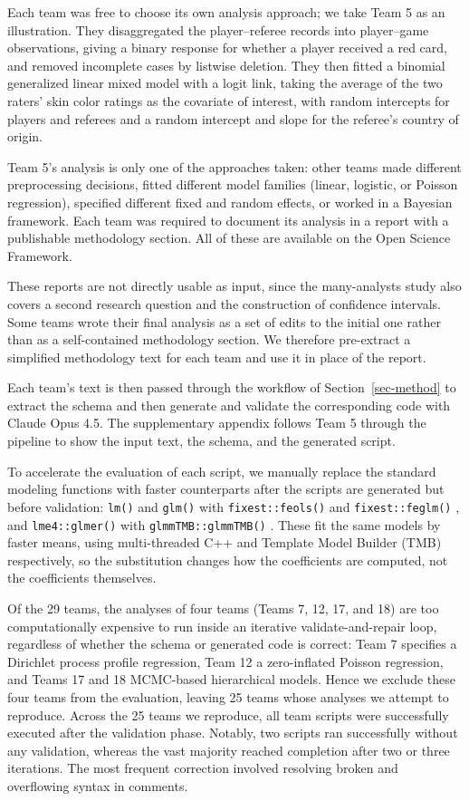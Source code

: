 \documentclass[aoas]{imsart}
\begin{document}
Each team was free to choose its own analysis approach; we take Team 5
as an illustration. They disaggregated the player--referee records into
player--game observations, giving a binary response for whether a player
received a red card, and removed incomplete cases by listwise deletion.
They then fitted a binomial generalized linear mixed model with a logit
link, taking the average of the two raters' skin color ratings as the
covariate of interest, with random intercepts for players and referees
and a random intercept and slope for the referee's country of origin.

Team 5's analysis is only one of the approaches taken: other teams made
different preprocessing decisions, fitted different model families
(linear, logistic, or Poisson regression), specified different fixed and
random effects, or worked in a Bayesian framework. Each team was
required to document its analysis in a report with a publishable
methodology section. All of these are available on the Open Science
Framework.

These reports are not directly usable as input, since the many-analysts
study also covers a second research question and the construction of
confidence intervals. Some teams wrote their final analysis as a set of
edits to the initial one rather than as a self-contained methodology
section. We therefore pre-extract a simplified methodology text for each
team and use it in place of the report.

Each team's text is then passed through the workflow of
Section~\ref{sec-method} to extract the schema and then generate and
validate the corresponding code with Claude Opus 4.5. The supplementary
appendix follows Team 5 through the pipeline to show the input text, the
schema, and the generated script.

To accelerate the evaluation of each script, we manually replace the
standard modeling functions with faster counterparts after the scripts
are generated but before validation: \texttt{lm()} and \texttt{glm()}
with \texttt{fixest::feols()} and \texttt{fixest::feglm()}
\citep{fixest}, and \texttt{lme4::glmer()} \citep{lme4} with
\texttt{glmmTMB::glmmTMB()} \citep{glmmTMB-1}. These fit the same models
by faster means, using multi-threaded C++ and Template Model Builder
(TMB) respectively, so the substitution changes how the coefficients are
computed, not the coefficients themselves.

Of the 29 teams, the analyses of four teams (Teams 7, 12, 17, and 18)
are too computationally expensive to run inside an iterative
validate-and-repair loop, regardless of whether the schema or generated
code is correct: Team 7 specifies a Dirichlet process profile
regression, Team 12 a zero-inflated Poisson regression, and Teams 17 and
18 MCMC-based hierarchical models. Hence we exclude these four teams
from the evaluation, leaving 25 teams whose analyses we attempt to
reproduce. Across the 25 teams we reproduce, all team scripts were
successfully executed after the validation phase. Notably, two scripts
ran successfully without any validation, whereas the vast majority
reached completion after two or three iterations. The most frequent
correction involved resolving broken and overflowing syntax in comments.
\end{document}
